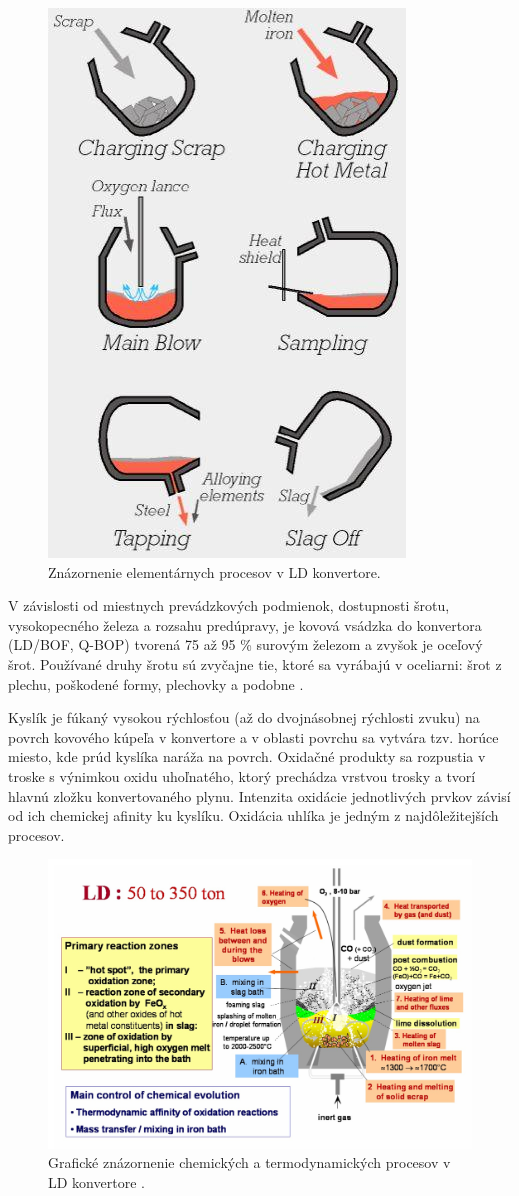 \documentclass[]{tukediphc}
\begin{document}
\begin{figure}[h!]
	\centering
	\includegraphics[width=.4\textwidth,angle=0]{convertor-phases.jpg}
	\caption{Znázornenie elementárnych procesov v LD konvertore.}
	\label{o:30}
\end{figure}

V závislosti od miestnych prevádzkových podmienok, dostupnosti šrotu, vysokopecného železa a rozsahu predúpravy, je kovová vsádzka do konvertora (LD/BOF, Q-BOP) tvorená 75 až 95 \% surovým železom a zvyšok je oceľový šrot. Používané druhy šrotu sú zvyčajne tie, ktoré sa vyrábajú v oceliarni: šrot z plechu, poškodené formy, plechovky a podobne \citep{Turkdogan1996}.

Kyslík je fúkaný vysokou rýchlosťou (až do dvojnásobnej rýchlosti zvuku) na povrch kovového kúpeľa v konvertore a v oblasti povrchu sa vytvára tzv. horúce miesto, kde prúd kyslíka naráža na povrch. Oxidačné produkty sa rozpustia v troske s výnimkou oxidu uhoľnatého, ktorý prechádza vrstvou trosky a tvorí hlavnú zložku konvertovaného plynu. Intenzita oxidácie jednotlivých prvkov závisí od ich chemickej afinity ku kyslíku. Oxidácia uhlíka je jedným z najdôležitejších procesov.

\begin{figure}[h!]
	\centering
	\includegraphics[width=1\textwidth,angle=0]{figures/ld-convertor-processes-graphical.jpg}
	\caption{Grafické znázornenie chemických a termodynamických procesov v LD konvertore \citep{Jalkanen2006}.}
\end{figure}
\end{document}
